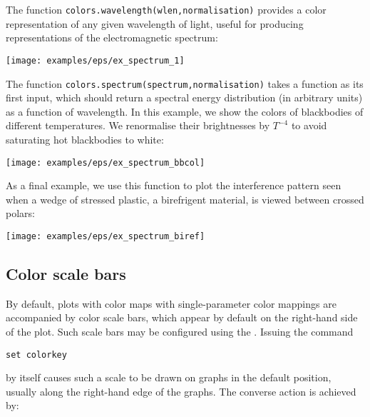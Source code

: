 The function {\tt colors.wavelength(wlen,normalisation)} provides a color representation of any given wavelength of light, useful for producing representations of the electromagnetic spectrum:

\vspace{2mm}

\vspace{2mm}

\centerline{\texttt{[image: examples/eps/ex\_spectrum\_1]}}

The function {\tt colors.spectrum(spectrum,normalisation)} takes a function as its first input, which should return a spectral energy distribution (in arbitrary units) as a function of wavelength. In this example, we show the colors of blackbodies of different temperatures. We renormalise their brightnesses by $T^{-4}$ to avoid saturating hot blackbodies to white:

\vspace{2mm}

\vspace{2mm}

\centerline{\texttt{[image: examples/eps/ex\_spectrum\_bbcol]}}

As a final example, we use this function to plot the interference pattern seen when a wedge of stressed plastic, a birefrigent material, is viewed between crossed polars:

\vspace{2mm}

\vspace{2mm}

\centerline{\texttt{[image: examples/eps/ex\_spectrum\_biref]}}

\subsection{Color scale bars}

By default, plots with color maps with single-parameter color mappings are
accompanied by color scale bars, which appear by default on the right-hand
side of the plot. Such scale bars may be configured using the . Issuing the command

\begin{verbatim}
set colorkey
\end{verbatim}

\noindent by itself causes such a scale to be drawn on graphs in the default
position, usually along the right-hand edge of the graphs. The converse action
is achieved by:

